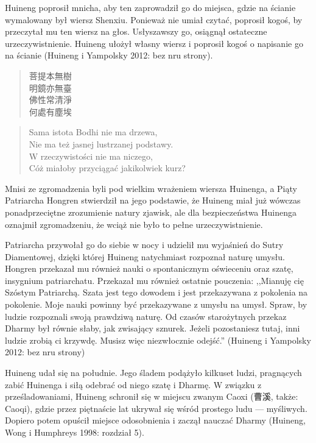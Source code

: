 Huineng poprosił mnicha, aby ten zaprowadził go do miejsca, gdzie na ścianie wymalowany był wiersz Shenxiu. Ponieważ nie umiał czytać, poprosił kogoś, by przeczytał mu ten wiersz na głos. Usłyszawszy go, osiągnął ostateczne urzeczywistnienie. Huineng ułożył własny wiersz i poprosił kogoś o napisanie go na ścianie (Huineng i Yampolsky 2012: bez nru strony).

\begin{minipage}[t]{0.4\textwidth}
\begin{verse}
菩提本無樹\\
明鏡亦無臺\\
佛性常清淨\\
何處有塵埃
\end{verse}
\end{minipage}
\begin{minipage}[t]{0.6\textwidth}
\itshape
\begin{verse}
Sama istota Bodhi nie ma drzewa,\\
Nie ma też jasnej lustrzanej podstawy.\\
W rzeczywistości nie ma niczego,\\
Cóż miałoby przyciągać jakikolwiek kurz?
\end{verse}
\end{minipage}
\vspace*{6pt}

Mnisi ze zgromadzenia byli pod wielkim wrażeniem wiersza Huinenga, a Piąty Patriarcha Hongren stwierdził na jego podstawie, że Huineng miał już wówczas ponadprzeciętne zrozumienie natury zjawisk, ale dla bezpieczeństwa Huinenga oznajmił zgromadzeniu, że wciąż nie było to pełne urzeczywistnienie.

Patriarcha przywołał go do siebie w nocy i udzielił mu wyjaśnień do Sutry Diamentowej, dzięki której Huineng natychmiast rozpoznał naturę umysłu. Hongren przekazał mu również nauki o spontanicznym oświeceniu oraz szatę, insygnium patriarchatu. Przekazał mu również ostatnie pouczenia: ,,Mianuję cię Szóstym Patriarchą. Szata jest tego dowodem i jest przekazywana z pokolenia na pokolenie. Moje nauki powinny być przekazywane z umysłu na umysł. Spraw, by ludzie rozpoznali swoją prawdziwą naturę. Od czasów starożytnych przekaz Dharmy był równie słaby, jak zwisający sznurek. Jeżeli pozostaniesz tutaj, inni ludzie zrobią ci krzywdę. Musisz więc niezwłocznie odejść.'' (Huineng i Yampolsky 2012: bez nru strony)

Huineng udał się na południe. Jego śladem podążyło kilkuset ludzi, pragnących zabić Huinenga i siłą odebrać od niego szatę i Dharmę. W związku z prześladowaniami, Huineng schronił się w miejscu zwanym Caoxi (曹溪, także: Caoqi), gdzie przez piętnaście lat ukrywał się wśród prostego ludu --- myśliwych. Dopiero potem opuścił miejsce odosobnienia i zaczął nauczać Dharmy (Huineng, Wong i Humphreys 1998: rozdział 5).

